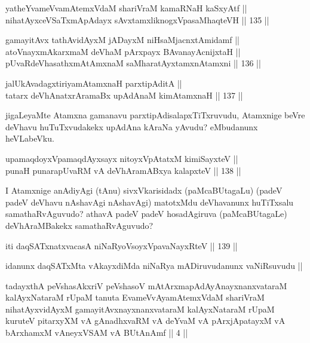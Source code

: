 \begin{shl}
yatheYvameVvamAtemxVdaM shariVraM kamaRNaH kaSxyAtf || \\
nihatAyxceVSaTxmApAdayx sAvxtamxliknogxVpasaMhaqteVH \hfill || 135 ||  
\end{shl}

\begin{shl}
gamayitAvx tathA\s vidAyxM jADayxM niHsaMjacnxtAmidamf ||  \\
atoV\s nayxmAkarxmaM deVhaM pArxpayx BAvanayA\s cnijxtaH || \\
pUvaRdeVhasathxmAtAmxnaM saMharatAyxtamxnA\s \s tamxni \hfill || 136 ||  
\end{shl}

\begin{shl}
jalUkAvadagxtiriyamAtamxnaH parxtipAditA || \\
tatarx deVhAnatxrAramaBx upAdAnaM kimAtamxnaH \hfill || 137 ||  
\end{shl}

\begin{artha}
jigaLeyaMte Atamxna gamanavu parxtipAdisalapxTiTxruvudu, Atamxnige
beVre deVhavu huTuTxvudakekx upAdAna kAraNa yAvudu? eMbudanunx
heVLabeVku.
\end{artha}


\begin{shl}
upamaqdoyxVpamaqdAyxsayx nitoyxVpAtatxM kimiSayxteV ||  \\
punaH punarapUvaRM vA deVhAramABxya kalapxteV \hfill || 138 ||  
\end{shl}

\begin{artha}
I Atamxnige anAdiyAgi (tAnu) sivxVkarisidadx (paMcaBUtagaLu) (padeV
padeV deVhavu nAshavAgi nAshavAgi) matotxMdu deVhavanunx huTiTxsalu
samathaRvAguvudo? athavA padeV padeV hosadAgiruva (paMcaBUtagaLe)
deVhAraMBakekx samathaRvAguvudo?
\end{artha}


\begin{shl}
iti daqSATxnatxvacasA niNaRyoV\s soyxVpavaNayxRteV \hfill || 139 ||
\end{shl}

\begin{artha}
idanunx daqSATxMta vAkayxdiMda niNaRya mADiruvudanunx vaNiRsuvudu ||
\end{artha}

\begin{kandikeshl}
tadayxthA peVshasAkxriV peVshasoV mAtArxmapAdAyAnayxnanxvataraM kalAyxNataraM rUpaM tanuta EvameVvAyamAtemxVdaM shariVraM nihatAyxvidAyxM gamayitAvxnayxnanxvataraM kalAyxNataraM rUpaM kuruteV pitarxyXM vA gAnadhxvaRM vA deYvaM vA pArxjApatayxM vA bArxhamxM vAneyxVSAM vA BUtAnAmf || 4 ||
\end{kandikeshl}

